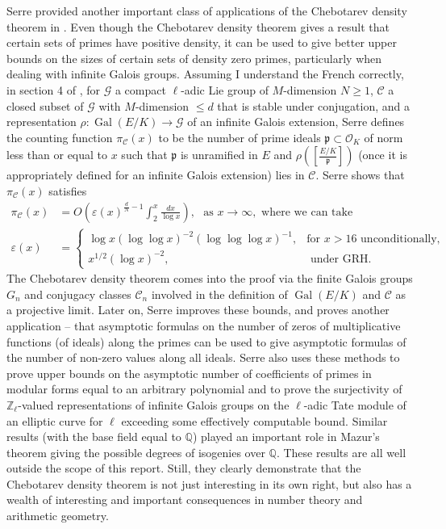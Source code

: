 \documentclass[12pt]{amsart}
\theoremstyle{definition}
\theoremstyle{remark}
\numberwithin{equation}{section}
\newcommand{\cC}{\mathcal C}
\newcommand{\cG}{\mathcal G}
\newcommand{\cO}{\mathcal O}
\newcommand{\fkp}{\mathfrak p}
\newcommand{\bbQ}{\mathbb Q}
\newcommand{\bbZ}{\mathbb Z}
\newcommand{\artin}[2]{\left[ \frac{#1}{#2}\right]}
\DeclareMathOperator{\Gal}{Gal}
\begin{document}
Serre provided another important class of applications of the Chebotarev density theorem in \cite{Serre81}. Even though the Chebotarev density theorem gives a result that certain sets of primes have positive density, it can be used to give better upper bounds on the sizes of certain sets of density zero primes, particularly when dealing with infinite Galois groups. Assuming I understand the French correctly, in section 4 of \cite{Serre81},  for $\cG$ a compact $\ell$-adic Lie group of $M$-dimension $N \geq 1$, $\cC$ a closed subset of $\cG$ with $M$-dimension $\leq d$ that is stable under conjugation, and a representation $\rho: \Gal(E/K) \to \cG$ of an infinite Galois extension, Serre defines the counting function $\pi_{\cC}(x)$ to be the number of prime ideals $\fkp \subset \cO_{K}$ of norm less than or equal to $x$ such that $\fkp$ is unramified in $E$ and  $\rho\left(\artin{E/K}{\fkp}\right)$ (once it is appropriately defined for an infinite Galois extension) lies in $\cC$. Serre shows that $\pi_{\cC}(x)$ satisfies
\begin{align}
\pi_{\cC}(x) & = O\left(\varepsilon(x)^{\frac{d}{N} - 1}\int_{2}^{x}\frac{dx}{\log x}\right),  \ \ \ \text{as } x \to \infty, \text{ where we can take}\\
\varepsilon(x) & = \begin{cases}\log x (\log \log x)^{-2} (\log \log \log x)^{-1}, & \text{for } x > 16 \text{ unconditionally,} \\
 x^{1/2}(\log x)^{-2}, &  \text{ under GRH.} \end{cases}
\end{align}
The Chebotarev density theorem comes into the proof via the finite Galois groups $G_n$ and conjugacy classes $\cC_n$ involved in the definition of $\Gal(E/K)$ and $\cC$ as a projective limit. Later on, Serre improves these bounds, and proves another application -- that asymptotic formulas on the number of zeros of multiplicative functions (of ideals) along the primes can be used to give asymptotic formulas of the number of non-zero values along all ideals. Serre also uses these methods to prove upper bounds on the asymptotic number of coefficients of primes in modular forms equal to an arbitrary polynomial and to prove the surjectivity of $\bbZ_{\ell}$-valued representations of infinite Galois groups on the $\ell$-adic Tate module of an elliptic curve for $\ell$ exceeding some effectively computable bound. Similar results (with the base field equal to $\bbQ$) played an important role in Mazur's theorem giving the possible degrees of isogenies over $\bbQ$. These results are all well outside the scope of this report. Still, they clearly demonstrate that the Chebotarev density theorem is not just interesting in its own right, but also has a wealth of interesting and important consequences in number theory and arithmetic geometry.
\end{document}
